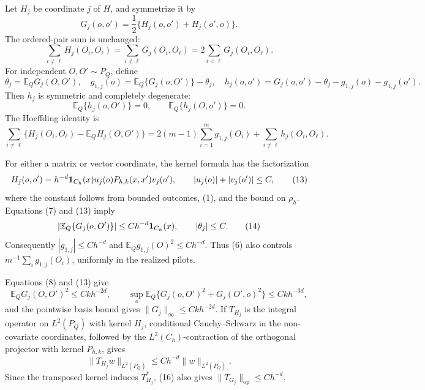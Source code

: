 Let \(H_j\) be coordinate \(j\) of \(H\), and symmetrize it by
\[
 G_j(o,o')=\frac12\{H_j(o,o')+H_j(o',o)\}.
\]
The ordered-pair sum is unchanged:
\[
 \sum_{i\ne \ell}H_j(O_i,O_\ell)
 =\sum_{i\ne \ell}G_j(O_i,O_\ell)
 =2\sum_{i<\ell}G_j(O_i,O_\ell).
\tag{9}
\]
For independent \(O,O'\sim P_Q\), define
\[
 \theta_j=\mathbb E_QG_j(O,O'),
 \quad g_{1,j}(o)=\mathbb E_Q\{G_j(o,O')\}-\theta_j,
 \quad h_j(o,o')=G_j(o,o')-\theta_j-g_{1,j}(o)-g_{1,j}(o').
\tag{10}
\]
Then \(h_j\) is symmetric and completely degenerate:
\[
 \mathbb E_Q\{h_j(o,O')\}=0,
 \qquad
 \mathbb E_Q\{h_j(O,o')\}=0.
\tag{11}
\]
The Hoeffding identity is
\[
 \sum_{i\ne\ell}\{H_j(O_i,O_\ell)-\mathbb E_QH_j(O,O')\}
 =2(m-1)\sum_{i=1}^m g_{1,j}(O_i)
  +\sum_{i\ne\ell}h_j(O_i,O_\ell).
\tag{12}
\]

For either a matrix or vector coordinate, the kernel formula has the factorization
\[
 H_j(o,o')=h^{-d}{\bf1}_{C_h}(x)u_j(o)
             P_{h,k}(x,x')v_j(o'),
 \qquad |u_j(o)|+|v_j(o')|\leq C,
\tag{13}
\]
where the constant follows from bounded outcomes, (1), and the bound on \(\rho_h\).  Equations (7) and (13) imply
\[
 |\mathbb E_Q\{G_j(o,O')\}|\le Ch^{-d}{\bf1}_{C_h}(x),
 \qquad |\theta_j|\le C.
\tag{14}
\]
Consequently \(|g_{1,j}|\le Ch^{-d}\) and \(\mathbb E_Qg_{1,j}(O)^2\le Ch^{-d}\).  Thus (6) also controls \(m^{-1}\sum_i g_{1,j}(O_i)\), uniformly in the realized pilots.

Equations (8) and (13) give
\[
 \mathbb E_QG_j(O,O')^2\le Ckh^{-2d},
 \qquad
 \sup_o\mathbb E_Q\{G_j(o,O')^2+G_j(O',o)^2\}
 \le Ckh^{-3d},
\tag{15}
\]
and the pointwise basis bound gives \(\|G_j\|_\infty\le Ckh^{-2d}\).  If \(T_{H_j}\) is the integral operator on \(L^2(P_Q)\) with kernel \(H_j\), conditional Cauchy--Schwarz in the non-covariate coordinates, followed by the \(L^2(C_h)\)-contraction of the orthogonal projector with kernel \(P_{h,k}\), gives
\[
 \|T_{H_j}w\|_{L^2(P_Q)}\le Ch^{-d}\|w\|_{L^2(P_Q)}.
\tag{16}
\]
Since the transposed kernel induces \(T_{H_j}^*\), (16) also gives \(\|T_{G_j}\|_{\mathrm{op}}\le Ch^{-d}\).

